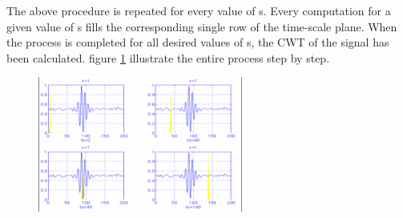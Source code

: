 \documentclass[12pt, a4paper, twoside]{report}
\begin{document}
The above procedure is repeated for every value of s. Every computation for a given value of s fills the corresponding single row of the time-scale plane. When the process is completed for all desired values of s, the CWT of the signal has been calculated. figure \ref{fig:cwt-1} illustrate the entire process step by step.

\begin{figure}[!h]
	\centering
	\includegraphics[width=0.6\textwidth]
	{images/chapter3/cwt-1}
	\caption{}
	\label{fig:cwt-1}
\end{figure}
\end{document}
